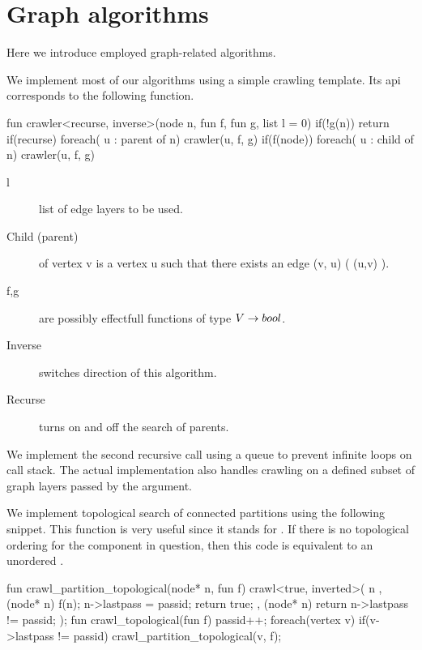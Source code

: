 
\section{Graph algorithms}

Here we introduce employed graph-related algorithms. 

We implement most of our algorithms using a simple crawling template. Its api corresponds to the following function.

\begin{code}
fun crawler<recurse, inverse>(node n, fun f, fun g, list l = {0})
{
  if(!g(n))
    return
  if(recurse)
    foreach( u : parent of n)
      crawler(u, f, g)
  if(f(node))
    foreach( u : child of n)
      crawler(u, f, g)
}
\end{code}

\begin{description}
  \item [l] list of edge layers to be used.
  \item [Child (parent)] of vertex v is a vertex u such that there exists an edge (v, u) ( (u,v) ).
  \item [f,g] are possibly effectfull functions of type $V \rightarrow bool$.
  \item [Inverse] switches direction of this algorithm.
  \item [Recurse] turns on and off the search of parents.
\end{description}

We implement the second recursive call using a queue to prevent infinite loops on call stack. The actual implementation also handles crawling on a defined subset of graph layers passed by the  argument.

We implement topological search of connected partitions using the following snippet. This function is very useful since it stands for . If there is no topological ordering for the component in question, then this code is equivalent to an unordered .

\begin{code}
fun crawl_partition_topological(node* n, fun f)
{
  crawl<true, inverted>( n
    , (node* n){ f(n); n->lastpass = passid; return true;}
    , (node* n){ return n->lastpass != passid;}
  );
}
fun crawl_topological(fun f)
{
  passid++;
  foreach(vertex v)
    if(v->lastpass != passid)
      crawl_partition_topological(v, f);
}
\end{code}

